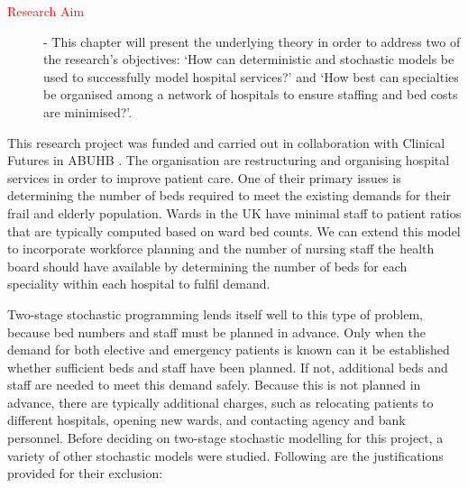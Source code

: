 \documentclass[../thesis.tex]{subfiles}
\begin{document}
\begin{description}
\item[\textcolor{red}{Research Aim}] - This chapter will present the underlying theory in order to address two of the research's objectives: `How can deterministic and stochastic models be used to successfully model hospital services?' and `How best can specialties be organised among a network of hospitals to ensure staffing and bed costs are minimised?'.
\end{description}

This research project was funded and carried out in collaboration with Clinical Futures in ABUHB \cite{UniAneurinBevanHealthBoard2018}. The organisation are restructuring and organising hospital services in order to improve patient care. One of their primary issues is determining the number of beds required to meet the existing demands for their frail and elderly population. Wards in the UK have minimal staff to patient ratios that are typically computed based on ward bed counts. We can extend this model to incorporate workforce planning and the number of nursing staff the health board should have available by determining the number of beds for each speciality within each hospital to fulfil demand.

Two-stage stochastic programming lends itself well to this type of problem, because bed numbers and staff must be planned in advance. Only when the demand for both elective and emergency patients is known can it be established whether sufficient beds and staff have been planned. If not, additional beds and staff are needed to meet this demand safely. Because this is not planned in advance, there are typically additional charges, such as relocating patients to different hospitals, opening new wards, and contacting agency and bank personnel. Before deciding on two-stage stochastic modelling for this project, a variety of other stochastic models were studied. Following are the justifications provided for their exclusion:
\end{document}
